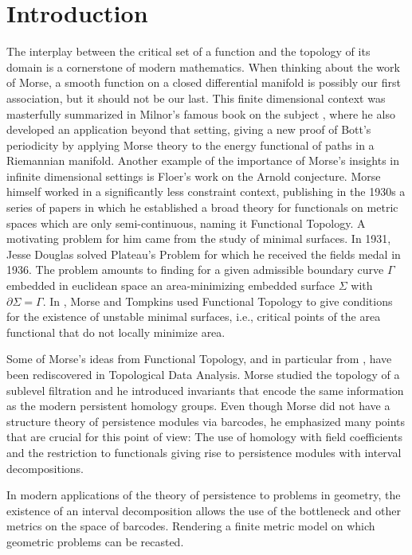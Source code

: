 
\section{Introduction}

The interplay between the critical set of a function and the topology of its domain is a cornerstone of modern mathematics.
When thinking about the work of Morse, a smooth function on a closed differential manifold is possibly our first association, but it should not be our last.
This finite dimensional context was masterfully summarized in Milnor's famous book on the subject \cite{MR0163331}, where he also developed an application beyond that setting, giving a new proof of Bott's periodicity by applying Morse theory to the energy functional of paths in a Riemannian manifold.
Another example of the importance of Morse's insights in infinite dimensional settings is Floer's work on the Arnold conjecture.
Morse himself worked in a significantly less constraint context, publishing in the 1930s a series of papers \cite{Morse.1937, Morse.1938, Morse.1940, MR9102} in which he established a broad theory for functionals on metric spaces which are only semi-continuous, naming it Functional Topology.
A motivating problem for him came from the study of minimal surfaces.
In 1931, Jesse Douglas solved Plateau’s Problem \cite{Douglas.1931} for which he received the fields medal in 1936.
The problem amounts to finding for a given admissible boundary curve $\Gamma$ embedded in euclidean space an area-minimizing embedded surface $\Sigma$ with $\partial \Sigma = \Gamma$.
In \cite{Morse.1939, Morse.1941}, Morse and Tompkins used Functional Topology to give conditions for the existence of unstable minimal surfaces, i.e., critical points of the area functional that do not locally minimize area.

Some of Morse's ideas from Functional Topology, and in particular from \cite{Morse.1940}, have been rediscovered in Topological Data Analysis.
Morse studied the topology of a sublevel filtration and he introduced invariants that encode the same information as the modern persistent homology groups.
Even though Morse did not have a structure theory of persistence modules via barcodes, he emphasized many points that are crucial for this point of view: The use of homology with field coefficients and the restriction to functionals giving rise to persistence modules with interval decompositions.

In modern applications of the theory of persistence to problems in geometry, the existence of an interval decomposition allows the use of the bottleneck and other metrics on the space of barcodes.
Rendering a finite metric model on which geometric problems can be recasted.

